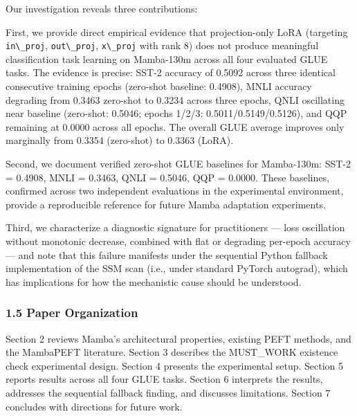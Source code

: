 Our investigation reveals three contributions:

First, we provide direct empirical evidence that projection-only LoRA (targeting \texttt{in\textbackslash \_proj}, \texttt{out\textbackslash \_proj}, \texttt{x\textbackslash \_proj} with rank 8) does not produce meaningful classification task learning on Mamba-130m across all four evaluated GLUE tasks. The evidence is precise: SST-2 accuracy of 0.5092 across three identical consecutive training epochs (zero-shot baseline: 0.4908), MNLI accuracy degrading from 0.3463 zero-shot to 0.3234 across three epochs, QNLI oscillating near baseline (zero-shot: 0.5046; epochs 1/2/3: 0.5011/0.5149/0.5126), and QQP remaining at 0.0000 across all epochs. The overall GLUE average improves only marginally from 0.3354 (zero-shot) to 0.3363 (LoRA).

Second, we document verified zero-shot GLUE baselines for Mamba-130m: SST-2 = 0.4908, MNLI = 0.3463, QNLI = 0.5046, QQP = 0.0000. These baselines, confirmed across two independent evaluations in the experimental environment, provide a reproducible reference for future Mamba adaptation experiments.

Third, we characterize a diagnostic signature for practitioners --- loss oscillation without monotonic decrease, combined with flat or degrading per-epoch accuracy --- and note that this failure manifests under the sequential Python fallback implementation of the SSM scan (i.e., under standard PyTorch autograd), which has implications for how the mechanistic cause should be understood.

\subsubsection{1.5 Paper Organization}

Section 2 reviews Mamba's architectural properties, existing PEFT methods, and the MambaPEFT literature. Section 3 describes the MUST\_WORK existence check experimental design. Section 4 presents the experimental setup. Section 5 reports results across all four GLUE tasks. Section 6 interprets the results, addresses the sequential fallback finding, and discusses limitations. Section 7 concludes with directions for future work.

